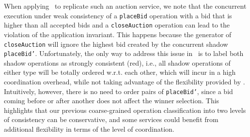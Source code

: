 When applying \RBCN\ to replicate such an auction service, we note that the concurrent execution
under weak consistency of a {\tt placeBid} operation with a bid 
that is higher than all accepted bids and a {\tt closeAuction} operation 
can lead to the violation of the application invariant. 
This happens because the generator of {\tt closeAuction} will ignore the highest bid created by 
the concurrent shadow {\tt placeBid'}. Unfortunately, 
the only way to address this issue in \RBCN\ is to label
both shadow operations as strongly consistent (red), i.e.,
all shadow operations of either type will be totally ordered w.r.t. each other, 
which will incur in a high coordination overhead, while not taking advantage of the flexibility provided by \RBCN.
Intuitively, however, there is no need to order pairs of {\tt placeBid'}, 
since a bid coming before or after another does not affect the winner selection.
This highlights that our previous coarse-grained operation classification into 
two levels of consistency can be conservative, and some services could benefit
from additional flexibility in terms of the level of coordination.

